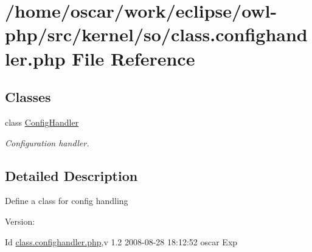 \hypertarget{class_8confighandler_8php}{
\section{/home/oscar/work/eclipse/owl-php/src/kernel/so/class.confighandler.php File Reference}
\label{class_8confighandler_8php}
}
\subsection*{Classes}
\begin{CompactItemize}
\item 
class \hyperlink{classConfigHandler}{ConfigHandler}
\begin{CompactList}\small\item\em Configuration handler. \item\end{CompactList}\end{CompactItemize}


\subsection{Detailed Description}
Define a class for config handling \begin{Desc}
\item[Version:]\end{Desc}
\begin{Desc}
\item[Id]\hyperlink{class_8confighandler_8php}{class.confighandler.php},v 1.2 2008-08-28 18:12:52 oscar Exp \end{Desc}
